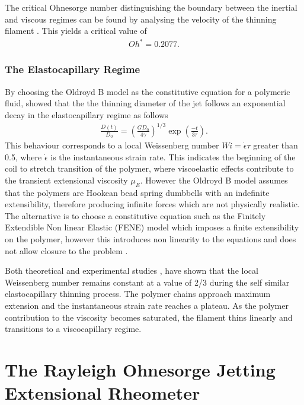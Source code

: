 \documentclass[11pt]{article}
\begin{document}
The critical Ohnesorge number distinguishing the boundary between the inertial 
and viscous regimes can be found by analysing the velocity of the thinning 
filament \cite{campo2010slow}. This yields a critical value of
\begin{align*}
Oh^* = 0.2077.
\end{align*}

\subsubsection{The Elastocapillary Regime} \label{sec:elasto}
By choosing the Oldroyd B model as the constitutive equation for a polymeric 
fluid, \cite{bazilevsky1990liquid} showed that the the thinning diameter of the 
jet follows an exponential decay in the elastocapillary regime as follows
\begin{align}
\frac{D(t)}{D_0} = \left(\frac{G D_0}{4 \gamma}\right)^{1/3} \exp 
\left(\frac{-t}{3 \tau}\right).
\label{eqn:elasto_thinning}
\end{align}
This behaviour corresponds to a local Weissenberg number $Wi = \dot{\epsilon} 
\tau$ greater than 0.5, where $\dot{\epsilon}$ is the instantaneous strain 
rate. This indicates the beginning of the coil to stretch transition of the 
polymer, where viscoelastic effects contribute to the transient extensional 
viscosity $\mu_E$. However the Oldroyd B model assumes that the polymers are 
Hookean bead spring dumbbells with an indefinite extensibility, therefore 
producing infinite forces which are not physically realistic. The alternative 
is to choose a constitutive equation such as the Finitely Extendible Non linear 
Elastic (FENE) model which imposes a finite extensibility on the polymer, 
however this introduces non linearity to the equations and does not allow 
closure to the problem \cite{entov1997effect}.

Both theoretical and experimental studies \citep{entov1997effect}, 
\citep{mckinley2005visco} have shown that the local Weissenberg number remains 
constant at a value of 2/3 during the self similar elastocapillary thinning 
process. The polymer chains approach maximum extension and the instantaneous 
strain rate reaches a plateau. As the polymer contribution to the viscosity 
becomes saturated, the filament thins linearly and transitions to a 
viscocapillary regime.

\newpage

\section{The Rayleigh Ohnesorge Jetting Extensional Rheometer}
\end{document}
